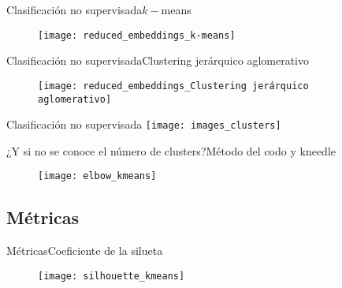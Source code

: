 \documentclass[aspectratio = 169]{beamer}
\begin{document}
			\begin{frame}{Clasificación no supervisada}{$k-$means}
				\begin{block}{}
					\begin{figure}
						\centering
						\texttt{[image: reduced\_embeddings\_k-means]}
						\label{fig:clusters_kmeans}
					\end{figure}
				\end{block}
			\end{frame}
			\begin{frame}{Clasificación no supervisada}{Clustering jerárquico aglomerativo}
				\begin{block}{}
					\begin{figure}
						\centering
						\texttt{[image: reduced\_embeddings\_Clustering jerárquico aglomerativo]}
						\label{fig:clusters_cja}
					\end{figure}
				\end{block}
			\end{frame}
			\begin{frame}{Clasificación no supervisada}
				\vspace{-2cm}
				\hspace{1.5cm}
				\texttt{[image: images\_clusters]}
			\end{frame}
			\begin{frame}{¿Y si no se conoce el número de clusters?}{Método del codo y kneedle}
				\begin{figure}
					\centering
					\texttt{[image: elbow\_kmeans]}
					\label{fig:elbow}
				\end{figure} 
			\end{frame}
		
		\subsection{Métricas}
		
			\begin{frame}{Métricas}{Coeficiente de la silueta}
				\begin{figure}
					\centering
					\texttt{[image: silhouette\_kmeans]}
					\label{fig:silhouette_kmeans}
				\end{figure} 
			\end{frame}
			
\end{document}
